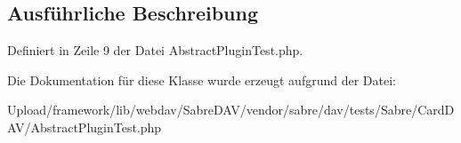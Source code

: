 \subsection{Ausführliche Beschreibung}


Definiert in Zeile 9 der Datei Abstract\+Plugin\+Test.\+php.



Die Dokumentation für diese Klasse wurde erzeugt aufgrund der Datei\+:\begin{DoxyCompactItemize}
\item 
Upload/framework/lib/webdav/\+Sabre\+D\+A\+V/vendor/sabre/dav/tests/\+Sabre/\+Card\+D\+A\+V/Abstract\+Plugin\+Test.\+php\end{DoxyCompactItemize}
